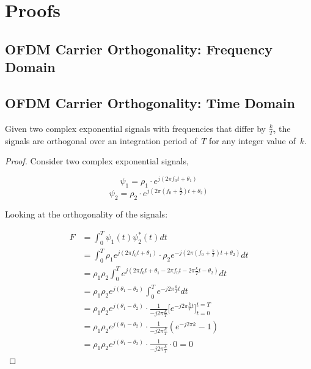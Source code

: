 \documentclass[class=report,11pt,crop=false]{standalone}
\begin{document}
\chapter{Proofs}

\section{OFDM Carrier Orthogonality: Frequency Domain}

\section{OFDM Carrier Orthogonality: Time Domain}

    Given two complex exponential signals with frequencies that differ by \(\frac{k}{T}\), the signals are orthogonal over an integration period of~\(T\) for any integer value of~\(k\).

\begin{proof}
    Consider two complex exponential signals,
    
    \begin{equation}
        \psi_1 = \rho_1 \cdot e^{j(2\pi f_0 t + \theta_1)}
    \end{equation}
    \begin{equation}
        \psi_2 = \rho_2 \cdot e^{j(2\pi (f_0 + \frac{k}{T})t + \theta_2)}
    \end{equation}

    Looking at the orthogonality of the signals:
    
        \setlength{\jot}{10pt}
        \begin{align}
            F &= \int_0^T \psi_1(t) \psi_2^*(t) dt \\
            &= \int_0^T \rho_1 e^{j(2\pi f_0 t + \theta_1)} \cdot \rho_2 e^{-j(2\pi (f_0 + \frac{k}{T})t + \theta_2)} dt \\
            &= \rho_1 \rho_2 \int_0^T e^{j(2\pi f_0 t + \theta_1 - 2\pi f_0 t - 2\pi \frac{k}{T}t - \theta_2)} dt \\
            &= \rho_1 \rho_2 e^{j(\theta_1 - \theta_2)} \int_0^T e^{-j 2\pi \frac{k}{T} t} dt \\
            &= \rho_1 \rho_2 e^{j(\theta_1 - \theta_2)} \cdot \frac{1}{-j2\pi\frac{k}{T}} \bigg[ e^{-j2\pi\frac{k}{T} t} \bigg]^{t=T}_{t=0} \\
            &= \rho_1 \rho_2 e^{j(\theta_1 - \theta_2)} \cdot \frac{1}{-j2\pi\frac{k}{T}} (e^{-j2\pi k} - 1) \\
            &= \rho_1 \rho_2 e^{j(\theta_1 - \theta_2)} \cdot \frac{1}{-j2\pi\frac{k}{T}} \cdot 0 = 0
        \end{align}
    
\end{proof}



\ifstandalone
% 
\fi
\end{document}
